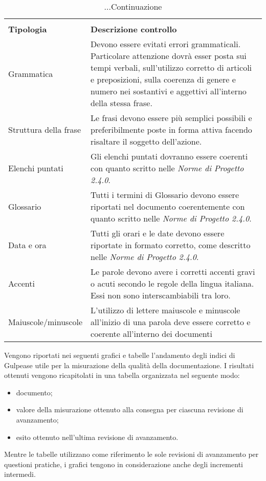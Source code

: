 \begin{longtable}{|C{4cm}|C{8.5cm}|}
	\caption{Tabella per la lista di controllo}\\
	\textbf{Tipologia} & \textbf{Descrizione controllo}\\
	\endfirsthead

	\caption[]{...Continuazione}

	\endhead

	Grammatica & Devono essere evitati errori grammaticali. Particolare attenzione dovrà esser posta sui tempi verbali, sull'utilizzo corretto di articoli e preposizioni, sulla coerenza di genere e numero nei sostantivi e aggettivi all'interno della stessa frase. \\

	Struttura della frase & Le frasi devono essere più semplici possibili e preferibilmente poste in forma attiva facendo risaltare il soggetto dell'azione. \\

	Elenchi puntati & Gli elenchi puntati dovranno essere coerenti con quanto scritto nelle \textit{Norme di Progetto 2.4.0\docs}. \\

	Glossario & Tutti i termini di Glossario devono essere riportati nel documento coerentemente con quanto scritto nelle \textit{Norme di Progetto 2.4.0\docs}. \\

	Data e ora & Tutti gli orari e le date devono essere riportate in formato corretto, come descritto nelle \textit{Norme di Progetto 2.4.0\docs}. \\

	Accenti & Le parole devono avere i corretti accenti gravi o acuti secondo le regole della lingua italiana. Essi non sono interscambiabili tra loro. \\

	Maiuscole/minuscole & L'utilizzo di lettere maiuscole e minuscole all'inizio di una parola deve essere corretto e coerente all'interno dei documenti\\
	\hline
\end{longtable}
\vspace{0.5cm}

\noindent Vengono riportati nei seguenti grafici e tabelle l'andamento degli indici di Gulpease utile per la misurazione della qualità della documentazione. I risultati ottenuti vengono ricapitolati in una tabella organizzata nel seguente modo:
\begin{itemize}
	\item documento;
	\item valore della misurazione ottenuto alla consegna per ciascuna revisione di avanzamento;
	\item esito ottenuto nell'ultima revisione di avanzamento.
\end{itemize}
Mentre le tabelle utilizzano come riferimento le sole revisioni di avanzamento per questioni pratiche, i grafici tengono in considerazione anche degli incrementi intermedi.

